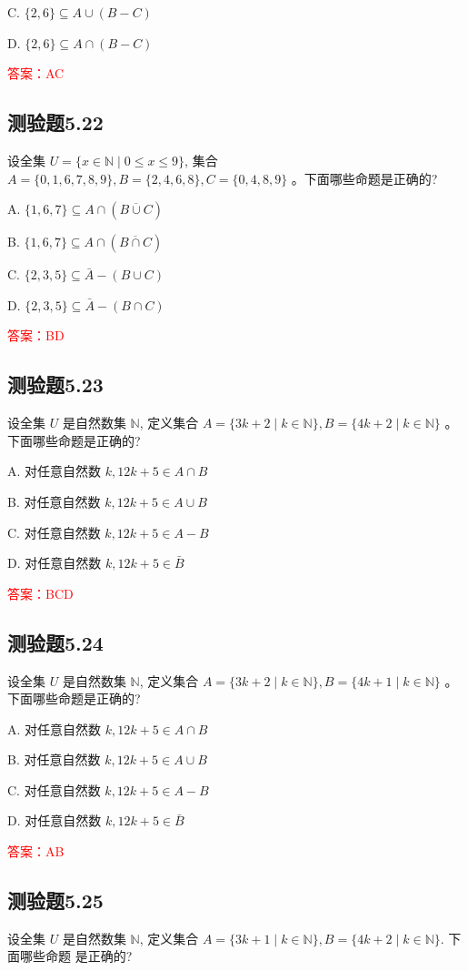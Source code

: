 \documentclass[UTF8, heading=true]{ctexart}
\begin{document}
C. $\{2,6\} \subseteq A \cup(B-C)$

D. $\{2,6\} \subseteq A \cap(B-C)$

\textcolor{red}{答案：AC}

\subsection{测验题5.22}

设全集 $U=\{x \in \mathbb{N} \mid 0 \leq x \leq 9\}$, 
集合 $A=\{0,1,6,7,8,9\}, B=\{2,4,6,8\}, C=\{0,4,8,9\}$ 。下面哪些命题是正确的?

A. $\{1,6,7\} \subseteq A \cap(\overline{B \cup C})$

B. $\{1,6,7\} \subseteq A \cap(\overline{B \cap C})$

C. $\{2,3,5\} \subseteq \bar{A}-(B \cup C)$

D. $\{2,3,5\} \subseteq \bar{A}-(B \cap C)$

\textcolor{red}{答案：BD}

\subsection{测验题5.23}
设全集 $U$ 是自然数集 $\mathbb{N}$, 定义集合 $A=\{3 k+2 \mid k \in \mathbb{N}\}, B=\{4 k+2 \mid k \in \mathbb{N}\}$ 。下面哪些命题是正确的?

A. 对任意自然数 $k, 12 k+5 \in A \cap B$

B. 对任意自然数 $k, 12 k+5 \in A \cup B$

C. 对任意自然数 $k, 12 k+5 \in A-B$

D. 对任意自然数 $k, 12 k+5 \in \bar{B}$

\textcolor{red}{答案：BCD}

\subsection{测验题5.24}

设全集 $U$ 是自然数集 $\mathbb{N}$, 定义集合 $A=\{3 k+2 \mid k \in \mathbb{N}\}, B=\{4 k+1 \mid k \in \mathbb{N}\}$ 。下面哪些命题是正确的?

A. 对任意自然数 $k, 12 k+5 \in A \cap B$

B. 对任意自然数 $k, 12 k+5 \in A \cup B$

C. 对任意自然数 $k, 12 k+5 \in A-B$

D. 对任意自然数 $k, 12 k+5 \in \bar{B}$

\textcolor{red}{答案：AB}

\subsection{测验题5.25}
设全集 $U$ 是自然数集 $\mathbb{N}$, 定义集合 $A=\{3 k+1 \mid k \in \mathbb{N}\}, B=\{4 k+2 \mid k \in \mathbb{N}\}$. 下面哪些命题
是正确的?
\end{document}
